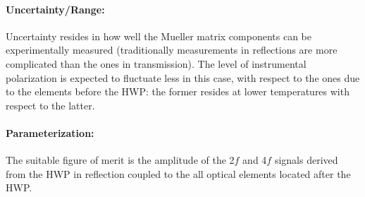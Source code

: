 
\paragraph{Uncertainty/Range:}
Uncertainty resides in how well the Mueller matrix components can be experimentally measured (traditionally measurements in reflections are more complicated than the ones in transmission). The level of instrumental polarization is expected to fluctuate less in this case, with respect to the ones due to the elements before the HWP: the former resides at lower temperatures with respect to the latter. 

\paragraph{Parameterization:}
The suitable figure of merit is the amplitude of the 2$f$ and 4$f$ signals derived from the HWP in reflection coupled to the all optical elements located after the HWP.
